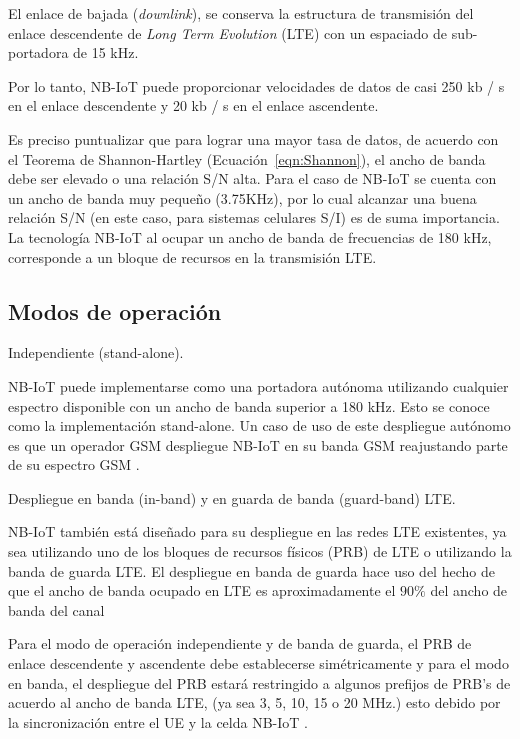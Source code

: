 El enlace de bajada (\textit{downlink}), se conserva la estructura de transmisión del enlace descendente de \textit{Long Term Evolution} (LTE) con un espaciado de sub-portadora de 15 kHz.\newline

Por lo tanto, NB-IoT puede proporcionar velocidades de datos de casi 250 kb / s en el enlace descendente y 20 kb / s en el enlace ascendente.\newline

Es preciso puntualizar que para lograr una mayor tasa de datos, de acuerdo con el Teorema de Shannon-Hartley (Ecuación~\ref{eqn:Shannon}), el ancho de banda debe ser elevado o una relación S/N alta. Para el caso de NB-IoT se cuenta con un ancho de banda muy pequeño (3.75KHz), por lo cual alcanzar una buena relación S/N (en este caso, para sistemas celulares S/I) es de suma importancia.\\

La tecnología NB-IoT al ocupar un ancho de banda de frecuencias de 180 kHz, corresponde a un bloque de recursos en la transmisión LTE. 

\subsection{Modos de operación}

Independiente (stand-alone).\newline

NB-IoT puede implementarse como una portadora autónoma utilizando cualquier espectro disponible con un ancho de banda superior a 180 kHz. Esto se conoce como la implementación stand-alone. Un caso de uso de este despliegue autónomo es que un operador GSM despliegue NB-IoT en su banda GSM reajustando parte de su espectro GSM \parencite{Liberg2018}.\newline

Despliegue en banda (in-band) y en guarda de banda (guard-band) LTE.\newline

NB-IoT también está diseñado para su despliegue en las redes LTE existentes, ya sea utilizando uno de los bloques de recursos físicos (PRB) de LTE o utilizando la banda de guarda LTE. El despliegue en banda de guarda hace uso del hecho de que el ancho de banda ocupado en LTE es aproximadamente el $90\%$ del ancho de banda del canal\newline

Para el modo de operación independiente y de banda de guarda, el PRB de enlace descendente y ascendente debe establecerse simétricamente y para el modo en banda, el despliegue del PRB estará restringido a algunos prefijos de PRB’s de acuerdo al ancho de banda LTE, (ya sea 3, 5, 10, 15 o 20 MHz.) esto debido por la sincronización entre el UE y la celda NB-IoT \parencite{NBIoTDeploymentGSMA}.

